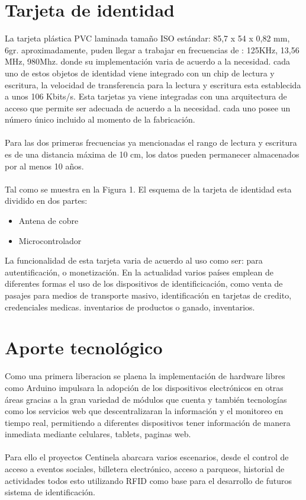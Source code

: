 \documentclass[11pt,twocolumn]{article}
\begin{document}
\section{Tarjeta de identidad}

La tarjeta plástica PVC laminada tamaño ISO estándar: 85,7 x 54 x 0,82 mm, 6gr. aproximadamente, puden llegar a trabajar en frecuencias de : 125KHz, 13,56 MHz, 980Mhz. donde su implementaci\'on varia de acuerdo a la necesidad. cada uno de 
estos objetos de identidad viene integrado con un chip de lectura y escritura, la velocidad de transferencia para la lectura y escritura esta establecida a unos 106 Kbits/s. Esta tarjetas ya viene integradas con una arquitectura de acceso que 
permite ser adecuada de acuerdo a la necesidad. cada uno posee un n\'umero \'unico incluido al momento de la fabricaci\'on.\\
\\
Para las dos primeras frecuencias ya mencionadas el rango de lectura y escritura es de una distancia m\'axima  de 10 cm, los datos pueden permanecer almacenados por al menos 10 a\~nos.\\
\\
Tal como se muestra en la Figura 1. El esquema de la tarjeta de identidad esta dividido en dos partes:\\

\begin{itemize}
	\item Antena de cobre
	\item Microcontrolador
\end{itemize}

La funcionalidad de esta tarjeta varia de acuerdo al uso como ser: para autentificaci\'on, o monetizaci\'on. En la actualidad varios pa\'ises emplean de diferentes formas el uso de los dispositivos de identificicaci\'on, como venta de pasajes para medios de transporte masivo, identificaci\'on en tarjetas de credito, credenciales medicas. inventarios de productos o ganado, inventarios.\\ 

\section{Aporte tecnol\'ogico}

Como una primera liberacion se plaena la implementaci\'on de hardware libres como Arduino impulsara la adopci\'on de los dispositivos electr\'onicos en otras \'areas gracias a la gran variedad de m\'odulos que cuenta y tambi\'en tecnolog\'ias como los servicios web que descentralizaran la informaci\'on y el monitoreo en tiempo real, permitiendo a diferentes dispositivos tener informaci\'on de manera inmediata mediante celulares, tablets, paginas web.\\
\\
Para ello el proyectos Centinela abarcara varios escenarios, desde el control de acceso a eventos sociales, billetera electr\'onico, acceso a parqueos, historial de actividades todos esto utilizando RFID como base para el desarrollo de futuros sistema de identificaci\'on.\\
\end{document}
